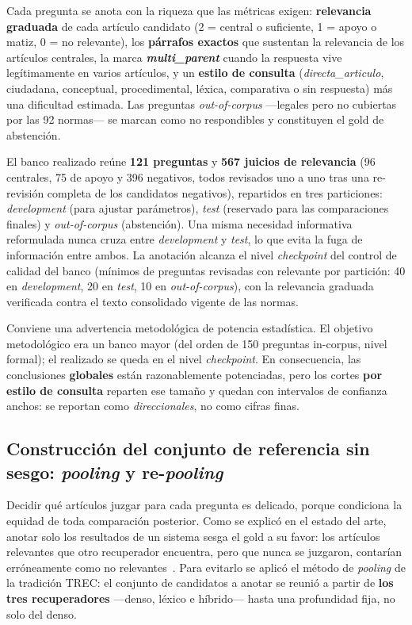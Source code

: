 Cada pregunta se anota con la riqueza que las métricas exigen: \textbf{relevancia graduada} de cada artículo candidato (2 = central o suficiente, 1 = apoyo o matiz, 0 = no relevante), los \textbf{párrafos exactos} que sustentan la relevancia de los artículos centrales, la marca \textbf{\emph{multi\_parent}} cuando la respuesta vive legítimamente en varios artículos, y un \textbf{estilo de consulta} (\emph{directa\_articulo}, ciudadana, conceptual, procedimental, léxica, comparativa o sin respuesta) más una dificultad estimada. Las preguntas \emph{out-of-corpus} —legales pero no cubiertas por las 92 normas— se marcan como no respondibles y constituyen el gold de abstención.

El banco realizado reúne \textbf{121 preguntas} y \textbf{567 juicios de relevancia} (96 centrales, 75 de apoyo y 396 negativos, todos revisados uno a uno tras una re-revisión completa de los candidatos negativos), repartidos en tres particiones: \emph{development} (para ajustar parámetros), \emph{test} (reservado para las comparaciones finales) y \emph{out-of-corpus} (abstención). Una misma necesidad informativa reformulada nunca cruza entre \emph{development} y \emph{test}, lo que evita la fuga de información entre ambos. La anotación alcanza el nivel \emph{checkpoint} del control de calidad del banco (mínimos de preguntas revisadas con relevante por partición: 40 en \emph{development}, 20 en \emph{test}, 10 en \emph{out-of-corpus}), con la relevancia graduada verificada contra el texto consolidado vigente de las normas.

Conviene una advertencia metodológica de potencia estadística. El objetivo metodológico era un banco mayor (del orden de 150 preguntas in-corpus, nivel formal); el realizado se queda en el nivel \emph{checkpoint}. En consecuencia, las conclusiones \textbf{globales} están razonablemente potenciadas, pero los cortes \textbf{por estilo de consulta} reparten ese tamaño y quedan con intervalos de confianza anchos: se reportan como \emph{direccionales}, no como cifras finas.

\subsection{Construcción del conjunto de referencia sin sesgo: \emph{pooling} y re-\emph{pooling}}
\label{subsec:pooling}

Decidir qué artículos juzgar para cada pregunta es delicado, porque condiciona la equidad de toda comparación posterior. Como se explicó en el estado del arte, anotar solo los resultados de un sistema sesga el gold a su favor: los artículos relevantes que otro recuperador encuentra, pero que nunca se juzgaron, contarían erróneamente como no relevantes~\cite{buckley2004incomplete}. Para evitarlo se aplicó el método de \emph{pooling} de la tradición TREC: el conjunto de candidatos a anotar se reunió a partir de \textbf{los tres recuperadores} —denso, léxico e híbrido— hasta una profundidad fija, no solo del denso.

